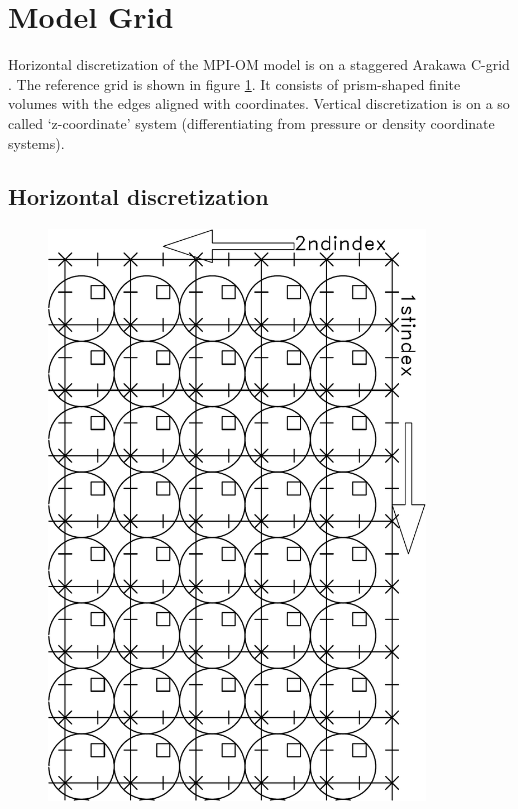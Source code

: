 \section{Model Grid}
\label{ch:numeric:grid}




Horizontal discretization of the \mbox{MPI-OM} model is on a staggered Arakawa C-grid \citep{arakawa77}.
The reference grid is shown in figure \ref{fig:numeric:grid:horizontal}.
It consists of prism-shaped finite volumes with the edges aligned with coordinates. 
Vertical discretization is on a so called `z-coordinate' system 
(differentiating from pressure or density coordinate systems).

\subsection{Horizontal discretization}
\label{ch:numeric:grid:horizontal}


\begin{figure}[!!!h]
\centerline{\hbox{\includegraphics[width=10.0cm,angle=90,clip]{cgricon_new}}}
\label{fig:numeric:grid:horizontal}
\end{figure}


